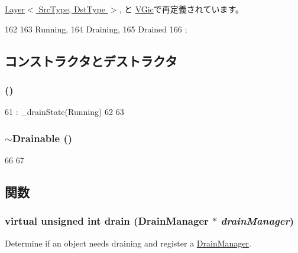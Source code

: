 \hyperlink{classBaseBus_1_1Layer_a5d74787dedbc4e11c1ab15bf487e61f8}{Layer$<$ SrcType, DstType $>$}, と \hyperlink{classVGic_a4ad4e2a479baf0de8e8cdcb0c84276db}{VGic}で再定義されています。


\begin{DoxyCode}
162                {
163         Running,  
164         Draining, 
165         Drained   
166     };
\end{DoxyCode}


\subsection{コンストラクタとデストラクタ}
\hypertarget{classDrainable_ab7e0a5035cfc2b76d859c266fa9f23ac}{
\subsubsection[{Drainable}]{ ()}}
\label{classDrainable_ab7e0a5035cfc2b76d859c266fa9f23ac}



\begin{DoxyCode}
61     : _drainState(Running)
62 {
63 }
\end{DoxyCode}
\hypertarget{classDrainable_acbac1c0890f30cd7ed12ce72c755a270}{
\subsubsection[{$\sim$Drainable}]{\setlength{\rightskip}{0pt plus 5cm}$\sim${\bf Drainable} ()}}
\label{classDrainable_acbac1c0890f30cd7ed12ce72c755a270}



\begin{DoxyCode}
66 {
67 }
\end{DoxyCode}


\subsection{関数}
\hypertarget{classDrainable_a1ed42c14f2f622ea6b0df3865e89c8b4}{
\subsubsection[{drain}]{\setlength{\rightskip}{0pt plus 5cm}virtual unsigned int drain ({\bf DrainManager} $\ast$ {\em drainManager})}}
\label{classDrainable_a1ed42c14f2f622ea6b0df3865e89c8b4}
Determine if an object needs draining and register a \hyperlink{classDrainManager}{DrainManager}.

